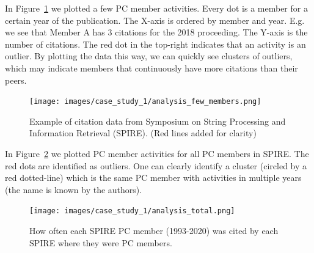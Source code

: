 \documentclass{ou-report}
\newcommand{\outline}[1]{{\color{blue} #1}}
\begin{document}





In Figure~\ref{fig:analysis_few} we plotted a few PC member activities. 
Every dot is a member for a certain year of the publication.
The X-axis is ordered by member and year. E.g. we see that 
Member A has 3 citations for the 2018 proceeding. The Y-axis is the number of 
citations. The red dot in the 
top-right indicates that an activity is an outlier. By plotting the data 
this way, we can quickly
see clusters of outliers, which may indicate members that continuously have 
more citations than their peers.

\begin{figure}[H]
    \centering
    \texttt{[image: images/case\_study\_1/analysis\_few\_members.png]}
    \caption{Example of citation data from Symposium on String Processing and 
    Information Retrieval (SPIRE). (Red lines added for clarity)}
    \label{fig:analysis_few}
\end{figure}



In Figure~\ref{fig:analysis_members} we plotted PC member activities for all PC 
members in SPIRE. The red dots are identified as outliers. One can clearly
identify a cluster (circled by a red dotted-line) which is the same PC member
with activities in multiple years (the name is known by the authors).

\begin{figure}[H]
    \centering
    \texttt{[image: images/case\_study\_1/analysis\_total.png]}
    \caption{How often each SPIRE PC member (1993-2020) was cited by each SPIRE where they were PC members.}
    \label{fig:analysis_members}
\end{figure}
\end{document}
